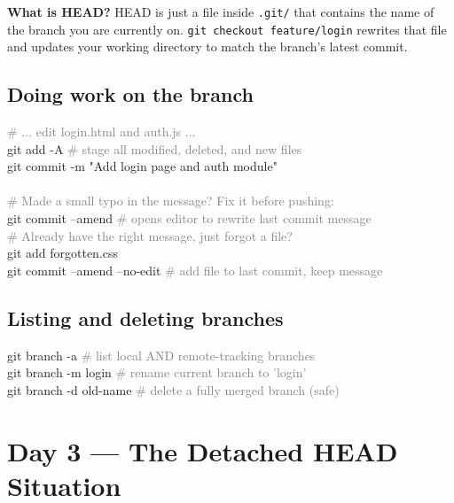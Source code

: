 \documentclass[10pt,a4paper]{article}
\newenvironment{codebox}{%
  \begin{mdframed}[backgroundcolor=codebg, linewidth=0pt,
    innerleftmargin=6pt, innerrightmargin=6pt,
    innertopmargin=4pt, innerbottommargin=4pt]%
  \small\ttfamily
}{%
  \end{mdframed}%
}
\newenvironment{notebox}{%
  \begin{mdframed}[backgroundcolor=notebg, linewidth=0.6pt,
    innerleftmargin=6pt, innerrightmargin=6pt,
    innertopmargin=3pt, innerbottommargin=3pt]%
  \small
}{%
  \end{mdframed}%
}
\newcommand{\cmd}[1]{\texttt{\small #1}}
\begin{document}
\begin{notebox}
\textbf{What is HEAD?} HEAD is just a file inside \texttt{.git/} that contains the name of the
branch you are currently on. \cmd{git checkout feature/login} rewrites that file
and updates your working directory to match the branch's latest commit.
\end{notebox}

\subsection{Doing work on the branch}
\vspace{0.5em}
\begin{codebox}
\textcolor{gray}{\# ... edit login.html and auth.js ...}\\
git add -A                          \textcolor{gray}{\# stage all modified, deleted, and new files}\\
git commit -m "Add login page and auth module"\\
\\
\textcolor{gray}{\# Made a small typo in the message? Fix it before pushing:}\\
git commit --amend                  \textcolor{gray}{\# opens editor to rewrite last commit message}\\
\textcolor{gray}{\# Already have the right message, just forgot a file?}\\
git add forgotten.css\\
git commit --amend --no-edit        \textcolor{gray}{\# add file to last commit, keep message}
\end{codebox}

\subsection{Listing and deleting branches}
\vspace{0.5em}
\begin{codebox}
git branch -a           \textcolor{gray}{\# list local AND remote-tracking branches}\\
git branch -m login     \textcolor{gray}{\# rename current branch to 'login'}\\
git branch -d old-name  \textcolor{gray}{\# delete a fully merged branch (safe)}
\end{codebox}

\section{Day 3 --- The Detached HEAD Situation}
\end{document}
